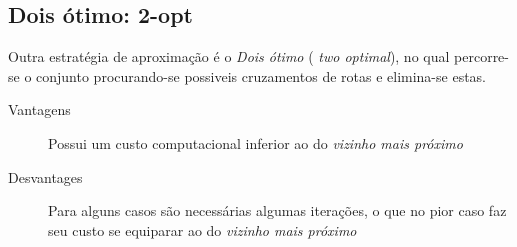 \documentclass[a4paper, 12pt]{article}
\begin{document}
\subsection{Dois ótimo: 2-opt}

	Outra estratégia de aproximação é o \emph{Dois ótimo} ( \emph{two optimal}),
no qual percorre-se o conjunto procurando-se possiveis cruzamentos de rotas e
elimina-se estas.

%
\begin{description}
 \item[Vantagens] Possui um custo computacional inferior ao do \emph{vizinho
mais próximo}
 \item[Desvantages] Para alguns casos são necessárias algumas iterações, o que
no pior caso faz seu custo se equiparar ao do \emph{vizinho mais próximo}
\end{description}
\end{document}
